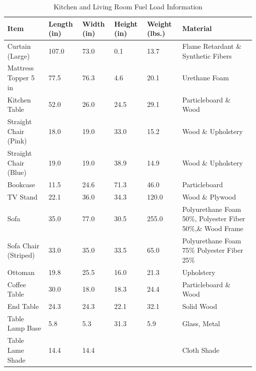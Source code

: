 \begin{table}[H]
\centering
\begin{tabular}{|L{0.23\textwidth}|C{0.08\textwidth}|C{0.08\textwidth}|C{0.08\textwidth}|C{0.08\textwidth}|L{0.25\textwidth}|}
\hline
Item 								&Length (in) 	&Width (in) 	&Height (in) 	&Weight (lbs.) 	&Material \\ \hline \hline
Curtain (Large) 					&107.0 			&73.0 			&0.1 			&13.7 			&Flame Retardant \& Synthetic Fibers \\ \hline
Mattress Topper 5 in 				&77.5 			&76.3 			&4.6 			&20.1  			&Urethane Foam \\ \hline
Kitchen Table 						&52.0 			&26.0 			&24.5 			&29.1 			&Particleboard \& Wood \\ \hline
Straight Chair (Pink) 				&18.0 			&19.0 			&33.0 			&15.2 			&Wood \& Upholstery \\ \hline
Straight Chair (Blue) 				&19.0 			&19.0 			&38.9			&14.9 			&Wood \& Upholstery \\ \hline
Bookcase 							&11.5 			&24.6	 		&71.3 			&46.0 			&Particleboard \\ \hline
TV Stand 							&22.1	 		&36.0 			&34.3 			&120.0 			&Wood \& Plywood \\ \hline
Sofa 								&35.0 			&77.0 			&30.5 			&255.0 			&Polyurethane Foam 50\%, Polyester Fiber 50\%,\& Wood Frame \\ \hline
Sofa Chair (Striped) 				&33.0 			&35.0 			&33.5 			&65.0 			&Polyurethane Foam 75\% Polyester Fiber 25\% \\ \hline
Ottoman 							&19.8 			&25.5 			&16.0 			&21.3 			&Upholstery \\ \hline
Coffee Table 			 			&30.0 			&18.0 			&18.3 			&24.4 			&Particleboard \& Wood \\ \hline
End Table 			 				&24.3 			&24.3 			&22.1	 		&32.1 			&Solid Wood \\ \hline
Table Lamp Base 					&5.8 			&5.3 			&31.3 			&5.9 			&Glass, Metal  \\ \hline
Table Lame Shade 					&14.4	 		&14.4	 		&  				&  				&Cloth Shade \\ \hline 
\end{tabular}
\caption{Kitchen and Living Room Fuel Load Information}
\label{table:k_lv_fuel_weights}
\end{table}

